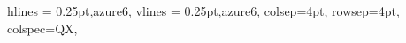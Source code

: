 \begin{appendices}
\begin{longtblr}[caption={Extrait des règles et pratiques de développement logiciel instaurées par Cegedim SRH}, label={tab:dev}]{
    hlines = {0.25pt,azure6},
    vlines = {0.25pt,azure6},
    colsep=4pt,
    rowsep=4pt,
	colspec={QX},
}

\end{longtblr}
\end{appendices}
